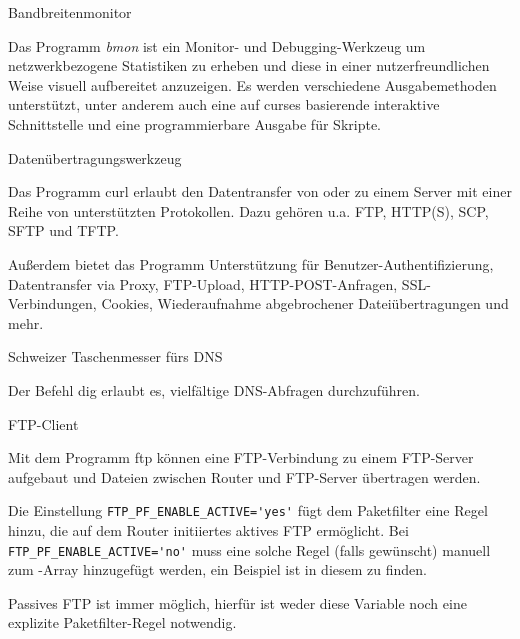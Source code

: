 \begin{description}

 Bandbreitenmonitor

    Das Programm \emph{bmon} ist ein Monitor- und Debugging-Werkzeug um
    netzwerkbezogene Statistiken zu erheben und diese in einer
    nutzerfreundlichen Weise visuell aufbereitet anzuzeigen. Es werden
    verschiedene Ausgabemethoden unterstützt, unter anderem auch eine auf curses
    basierende interaktive Schnittstelle und eine programmierbare Ausgabe für
    Skripte.

 Datenübertragungswerkzeug

    Das Programm curl erlaubt den Datentransfer von oder zu einem Server mit 
    einer Reihe von unterstützten Protokollen. Dazu gehören u.a. FTP, HTTP(S),
    SCP, SFTP und TFTP.

    Außerdem bietet das Programm Unterstützung für Benutzer-Authentifizierung, 
    Datentransfer via Proxy, FTP-Upload, HTTP-POST-Anfragen, SSL-Verbindungen,
    Cookies, Wiederaufnahme abgebrochener Dateiübertragungen und mehr.


 Schweizer Taschenmesser fürs DNS

    Der Befehl dig erlaubt es, vielfältige DNS-Abfragen durchzuführen.

     FTP-Client

    Mit dem Programm ftp können eine FTP-Verbindung zu einem FTP-Server
    aufgebaut und Dateien zwischen Router und FTP-Server übertragen werden.


    Die Einstellung \verb+FTP_PF_ENABLE_ACTIVE='yes'+ fügt dem Paketfilter eine
    Regel hinzu, die auf dem Router initiiertes aktives FTP ermöglicht.
    Bei \verb+FTP_PF_ENABLE_ACTIVE='no'+ muss eine solche
    Regel (falls gewünscht) manuell zum -Array hinzugefügt
    werden, ein Beispiel ist in diesem 
    zu finden.

    Passives FTP ist immer möglich, hierfür ist weder diese Variable noch eine
    explizite Paketfilter-Regel notwendig.


\end{description}
